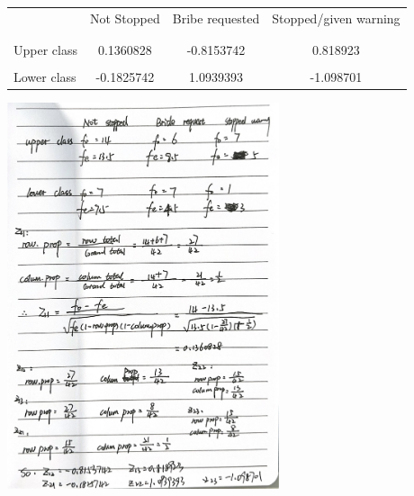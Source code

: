 \documentclass[12pt,letterpaper]{article}
\begin{document}
\begin{enumerate}
	\begin{table}[h]
		\centering
		\begin{tabular}{l | c c c }
			& Not Stopped & Bribe requested & Stopped/given warning \\
			\\[-1.8ex] 
			\hline \\[-1.8ex]
			Upper class  &0.1360828 &-0.8153742 &0.818923  \\
			\\
			Lower class  &-0.1825742&1.0939393  &-1.098701   \\
			
		\end{tabular}
	\end{table}
	
	 \begin{center}
		\item[]
		\includegraphics[width=0.6\textwidth]{question1.c.RJ.C.jpg} 
	\end{center}
	

\end{enumerate}
\end{document}

